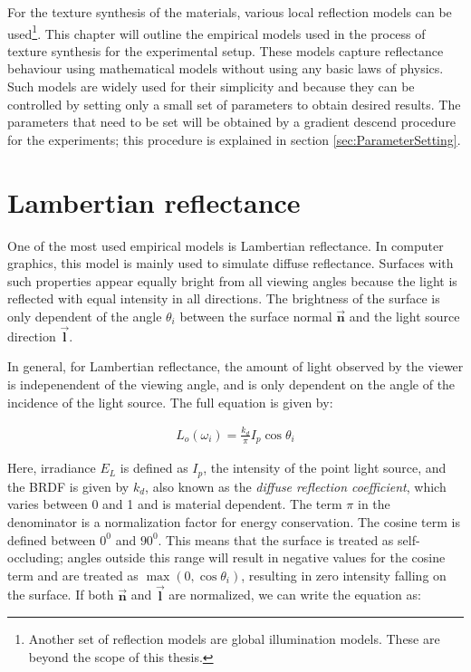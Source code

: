 \hypertarget{empiricalModels}{
}

\noindent For the texture synthesis of the materials, various local reflection models can be used\footnote[1]{Another set of reflection models are global illumination models. These are beyond the scope of this thesis.}. This chapter will outline the empirical models used in the process of texture synthesis for the experimental setup. These models capture reflectance behaviour using mathematical models without using any basic laws of physics. Such models are widely used for their simplicity and because they can be controlled by setting only a small set of parameters to obtain desired results. The parameters that need to be set will be obtained by a gradient descend procedure for the experiments; this procedure is explained in section \ref{sec:ParameterSetting}.

\section{Lambertian reflectance}\label{sec:Lambertian}
	One of the most used empirical models is Lambertian reflectance. In computer graphics, this model is mainly used to simulate diffuse reflectance. Surfaces with such properties appear equally bright from all viewing angles because the light is reflected with equal intensity in all directions. The brightness of the surface is only dependent of the angle $\theta_i$ between the surface normal $\vec{\mathbf{n}}$ and the light source direction $\vec{\mathbf{l}}$. 

In general, for Lambertian reflectance, the amount of light observed by the viewer is indepenendent of the viewing angle, and is only dependent on the angle of the incidence of the light source. The full equation is given by:

		\begin{eqnarray*}
			L_o(\omega_i) = \frac{k_d}{\pi}I_p\cos\theta_i
		\end{eqnarray*}

Here, irradiance $E_L$ is defined as $I_p$, the intensity of the point light source, and the BRDF is given by $k_d$, also known as the {\it diffuse reflection coefficient}, which varies between 0 and 1 and is material dependent. The term $\pi$ in the denominator is a normalization factor for energy conservation. The cosine term is defined between $0^0$ and $90^0$. This means that the surface is treated as self-occluding; angles outside this range will result in negative values for the cosine term and are treated as $\max({0,\cos\theta_i})$, resulting in zero intensity falling on the surface. If both $\vec{\mathbf{n}}$ and $\vec{\mathbf{l}}$ are normalized, we can write the equation as:

